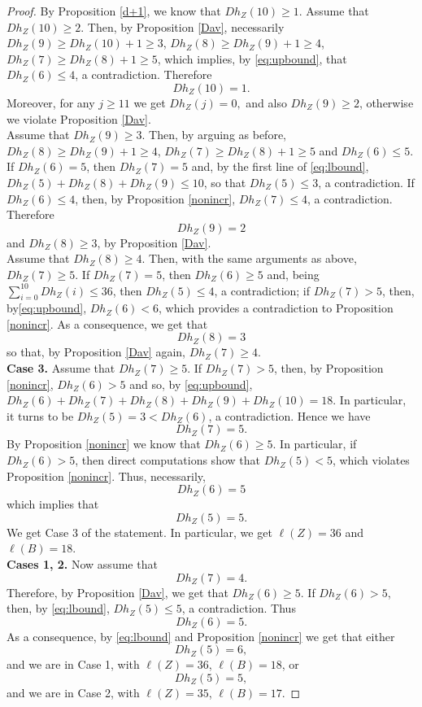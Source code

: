 \documentclass{amsart}
\theoremstyle{definition}
\begin{document}
\begin{proof}
By Proposition \ref{d+1}, we know that $ Dh_{Z}(10) \geq 1 $. Assume that $ Dh_{Z}(10) \geq 2 $. Then, by Proposition \ref{Dav}, necessarily
$ Dh_{Z}(9) \geq Dh_{Z}(10) + 1 \geq 3 $, $ Dh_{Z}(8) \geq Dh_{Z}(9) + 1 \geq 4 $, $ Dh_{Z}(7) \geq Dh_{Z}(8) + 1 \geq 5 $, 
which implies, by \eqref{eq:upbound}, that $  Dh_{Z}(6) \leq 4 $, a contradiction. Therefore
$$ Dh_{Z}(10) = 1. $$
Moreover, for any $ j \geq 11 $ we get  $ Dh_{Z}(j) = 0, $ and also $ Dh_{Z}(9) \geq 2 $, otherwise we violate Proposition \ref{Dav}.\\
Assume that $ Dh_{Z}(9) \geq 3 $. Then, by arguing as before, $ Dh_{Z}(8) \geq Dh_{Z}(9) + 1 \geq 4 $, $ Dh_{Z}(7) \geq Dh_{Z}(8) + 1 \geq 5 $ and $  Dh_{Z}(6) \leq 5 $. If $  Dh_{Z}(6) = 5 $, then $  Dh_{Z}(7) = 5 $ and, by the first line of \eqref{eq:lbound}, $ Dh_{Z}(5) + Dh_{Z}(8) + Dh_{Z}(9) \leq 10 $, so that $ Dh_{Z}(5) \leq 3 $, a contradiction. 
If $ Dh_{Z}(6) \leq 4 $, then, by Proposition \ref{nonincr}, $ Dh_{Z}(7) \leq 4 $, a contradiction. Therefore
$$ Dh_{Z}(9) = 2 $$
and $ Dh_{Z}(8) \geq 3 $, by Proposition \ref{Dav}. \\
Assume that $ Dh_{Z}(8) \geq 4 $. Then, with the same arguments as above, $ Dh_{Z}(7) \geq 5 $. If $ Dh_{Z}(7) = 5 $, then $ Dh_{Z}(6) \geq 5 $ and, being $ \sum_{i = 0}^{10} Dh_{Z}(i) \leq 36 $, then $ Dh_{Z}(5) \leq 4 $, a contradiction; if $ Dh_{Z}(7) > 5 $, then, by\eqref{eq:upbound}, $ Dh_{Z}(6) < 6 $, which provides a contradiction to Proposition \ref{nonincr}. As a consequence, we get that 
$$ Dh_{Z}(8) = 3 $$
so that, by Proposition \ref{Dav} again,  $ Dh_{Z}(7) \geq 4 $. \\
{\bf Case 3.} Assume that $ Dh_{Z}(7) \geq 5 $. If $ Dh_{Z}(7) > 5 $, then, by Proposition \ref{nonincr}, $ Dh_{Z}(6) > 5 $ and so, by \eqref{eq:upbound}, $ Dh_{Z}(6) + Dh_{Z}(7) + Dh_{Z}(8) + Dh_{Z}(9) + Dh_{Z}(10) = 18 $. In particular, it turns to be $ Dh_{Z}(5) = 3 < Dh_{Z}(6)  $, a contradiction. Hence we have
$$ Dh_{Z}(7) = 5. $$
By Proposition \ref{nonincr} we know that $ Dh_{Z}(6) \geq 5 $. In particular, if $ Dh_{Z}(6) > 5 $, then direct computations show that $ Dh_{Z}(5) < 5 $, which violates Proposition \ref{nonincr}. Thus, necessarily,
$$ Dh_{Z}(6) = 5 $$
which implies that 
$$ Dh_{Z}(5) = 5. $$
We get Case 3 of the statement. In particular, we get $ \ell(Z) = 36 $ and $ \ell(B) = 18 $. \\
{\bf Cases 1, 2.} Now assume that 
$$ Dh_{Z}(7) = 4. $$
Therefore, by Proposition \ref{Dav}, we get that $ Dh_{Z}(6) \geq 5 $. If $ Dh_{Z}(6) > 5 $, then, by \eqref{eq:lbound}, $ Dh_{Z}(5) \leq 5 $,  a contradiction. Thus 
$$ Dh_{Z}(6) = 5. $$
As a consequence, by \eqref{eq:lbound} and Proposition \ref{nonincr} we get that either
$$ Dh_{Z}(5) = 6, $$
and we are in Case 1, with $ \ell(Z) = 36 $,  $ \ell(B) = 18 $, or
$$ Dh_{Z}(5) = 5, $$
and we are in Case 2, with  $ \ell(Z) = 35 $, $ \ell(B) = 17 $. 
\end{proof}
\end{document}
